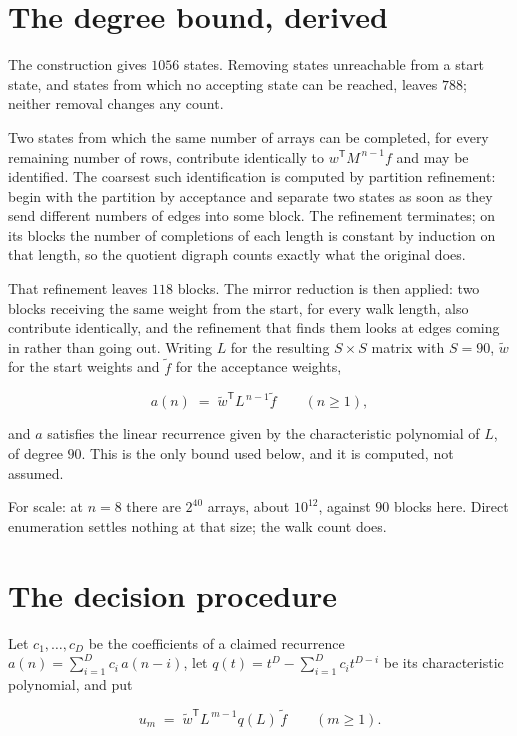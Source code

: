 \documentclass[11pt]{article}
\theoremstyle{definition}
\begin{document}
\section{The degree bound, derived}

The construction gives $1056$ states. Removing states unreachable from a start state, and states from which no accepting state can be reached, leaves $788$; neither removal changes any count.

Two states from which the same number of arrays can be completed, for every remaining number of rows, contribute identically to $w^{\mathsf T}M^{\,n-1}f$ and may be identified. The coarsest such identification is computed by partition refinement: begin with the partition by acceptance and separate two states as soon as they send different numbers of edges into some block. The refinement terminates; on its blocks the number of completions of each length is constant by induction on that length, so the quotient digraph counts exactly what the original does.

That refinement leaves $118$ blocks. The mirror reduction is then applied: two blocks receiving the same weight from the start, for every walk length, also contribute identically, and the refinement that finds them looks at edges coming in rather than going out. Writing $L$ for the resulting $S \times S$ matrix with $S = 90$, $\tilde w$ for the start weights and $\tilde f$ for the acceptance weights,

\[a(n) \;=\; \tilde w^{\mathsf T} L^{\,n-1} \tilde f \qquad (n \ge 1),\]

and $a$ satisfies the linear recurrence given by the characteristic polynomial of $L$, of degree $90$. This is the only bound used below, and it is computed, not assumed.

For scale: at $n = 8$ there are $2^{40}$ arrays, about $10^{12}$, against $90$ blocks here. Direct enumeration settles nothing at that size; the walk count does.

\section{The decision procedure}

Let $c_1,\dots,c_D$ be the coefficients of a claimed recurrence $a(n) = \sum_{i=1}^{D} c_i\,a(n-i)$, let $q(t) = t^{D} - \sum_{i=1}^{D} c_i t^{D-i}$ be its characteristic polynomial, and put

\[u_m \;=\; \tilde w^{\mathsf T} L^{\,m-1} q(L)\,\tilde f \qquad (m \ge 1).\]
\end{document}
